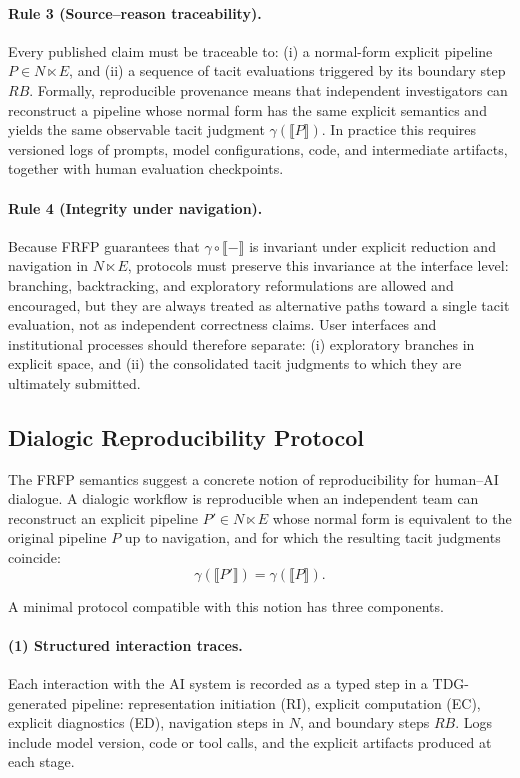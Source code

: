 \paragraph{Rule 3 (Source–reason traceability).}
Every published claim must be traceable to:
(i) a normal-form explicit pipeline \(P \in N \ltimes E\), and
(ii) a sequence of tacit evaluations triggered by its boundary step \(RB\).
Formally, reproducible provenance means that independent investigators can reconstruct
a pipeline whose normal form has the same explicit semantics and yields the same
observable tacit judgment \(\gamma(\llbracket P \rrbracket)\). In practice this
requires versioned logs of prompts, model configurations, code, and intermediate
artifacts, together with human evaluation checkpoints.

\paragraph{Rule 4 (Integrity under navigation).}
Because FRFP guarantees that \(\gamma \circ \llbracket - \rrbracket\) is invariant
under explicit reduction and navigation in \(N \ltimes E\), protocols must preserve
this invariance at the interface level: branching, backtracking, and exploratory
reformulations are allowed and encouraged, but they are always treated as alternative
paths toward a single tacit evaluation, not as independent correctness claims. User
interfaces and institutional processes should therefore separate:
(i) exploratory branches in explicit space, and
(ii) the consolidated tacit judgments to which they are ultimately submitted.

\subsection{Dialogic Reproducibility Protocol}

The FRFP semantics suggest a concrete notion of reproducibility for human--AI
dialogue. A dialogic workflow is reproducible when an independent team can reconstruct
an explicit pipeline \(P' \in N \ltimes E\) whose normal form is equivalent to the
original pipeline \(P\) up to navigation, and for which the resulting tacit
judgments coincide:
\[
  \gamma(\llbracket P' \rrbracket) = \gamma(\llbracket P \rrbracket).
\]

A minimal protocol compatible with this notion has three components.

\paragraph{(1) Structured interaction traces.}
Each interaction with the AI system is recorded as a typed step in a TDG-generated
pipeline: representation initiation (RI), explicit computation (EC), explicit
diagnostics (ED), navigation steps in \(N\), and boundary steps \(RB\). Logs include
model version, code or tool calls, and the explicit artifacts produced at each stage.

